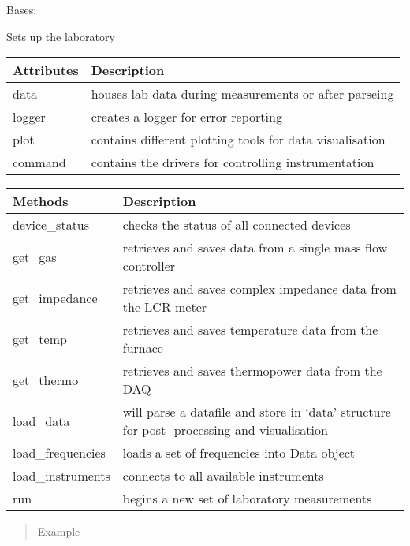 \documentclass[letterpaper,10pt,english]{sphinxmanual}
\begin{document}
\begin{fulllineitems}
\label{\detokenize{source/laboratory:laboratory.setup.Setup}}
Bases: 

Sets up the laboratory


\begin{savenotes}\sphinxattablestart
\centering
\begin{tabulary}{\linewidth}[t]{|T|T|}
\hline
\sphinxstyletheadfamily 
Attributes
&\sphinxstyletheadfamily 
Description
\\
\hline
data
&
houses lab data during measurements or after parseing
\\
\hline
logger
&
creates a logger for error reporting
\\
\hline
plot
&
contains different plotting tools for data visualisation
\\
\hline
command
&
contains the drivers for controlling instrumentation
\\
\hline
\end{tabulary}
\par
\sphinxattableend\end{savenotes}


\begin{savenotes}\sphinxattablestart
\centering
\begin{tabulary}{\linewidth}[t]{|T|T|}
\hline
\sphinxstyletheadfamily 
Methods
&\sphinxstyletheadfamily 
Description
\\
\hline
device\_status
&
checks the status of all connected devices
\\
\hline
get\_gas
&
retrieves and saves data from a single mass flow controller
\\
\hline
get\_impedance
&
retrieves and saves complex impedance data from the LCR meter
\\
\hline
get\_temp
&
retrieves and saves temperature data from the furnace
\\
\hline
get\_thermo
&
retrieves and saves thermopower data from the DAQ
\\
\hline
load\_data
&
will parse a datafile and store in ‘data’ structure for post-
processing and visualisation
\\
\hline
load\_frequencies
&
loads a set of frequencies into Data object
\\
\hline
load\_instruments
&
connects to all available instruments
\\
\hline
run
&
begins a new set of laboratory measurements
\\
\hline
\end{tabulary}
\par
\sphinxattableend\end{savenotes}
\begin{quote}\begin{description}
\item[{Example}] \leavevmode
\end{description}\end{quote}


\end{fulllineitems}
\end{document}
